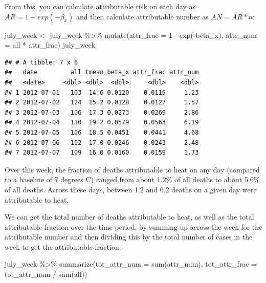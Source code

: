\documentclass[
]{book}
\newenvironment{Shaded}{\begin{snugshade}}{\end{snugshade}}
\newcommand{\AttributeTok}[1]{\textcolor[rgb]{0.77,0.63,0.00}{#1}}
\newcommand{\DecValTok}[1]{\textcolor[rgb]{0.00,0.00,0.81}{#1}}
\newcommand{\FunctionTok}[1]{\textcolor[rgb]{0.00,0.00,0.00}{#1}}
\newcommand{\NormalTok}[1]{#1}
\newcommand{\OtherTok}[1]{\textcolor[rgb]{0.56,0.35,0.01}{#1}}
\newcommand{\SpecialCharTok}[1]{\textcolor[rgb]{0.00,0.00,0.00}{#1}}
\begin{document}
From this, you can calculate attributable risk on each day as \(AR = 1 - exp(-\beta_x)\) and then calculate attributable number as \(AN = AR * n\):

\begin{Shaded}
\begin{Highlighting}[]
\NormalTok{july\_week }\OtherTok{\textless{}{-}}\NormalTok{ july\_week }\SpecialCharTok{\%\textgreater{}\%} 
  \FunctionTok{mutate}\NormalTok{(}\AttributeTok{attr\_frac =} \DecValTok{1} \SpecialCharTok{{-}} \FunctionTok{exp}\NormalTok{(}\SpecialCharTok{{-}}\NormalTok{beta\_x),}
         \AttributeTok{attr\_num =}\NormalTok{ all }\SpecialCharTok{*}\NormalTok{ attr\_frac)}
\NormalTok{july\_week}
\end{Highlighting}
\end{Shaded}

\begin{verbatim}
## # A tibble: 7 x 6
##   date         all tmean beta_x attr_frac attr_num
##   <date>     <dbl> <dbl>  <dbl>     <dbl>    <dbl>
## 1 2012-07-01   103  14.6 0.0120    0.0119     1.23
## 2 2012-07-02   124  15.2 0.0128    0.0127     1.57
## 3 2012-07-03   106  17.3 0.0273    0.0269     2.86
## 4 2012-07-04   110  19.2 0.0579    0.0563     6.19
## 5 2012-07-05   106  18.5 0.0451    0.0441     4.68
## 6 2012-07-06   102  17.0 0.0246    0.0243     2.48
## 7 2012-07-07   109  16.0 0.0160    0.0159     1.73
\end{verbatim}

Over this week, the fraction of deaths attributable to heat on any day (compared to a baseline of 7 degrees C) ranged from about 1.2\% of all deaths to about 5.6\% of all deaths. Across these days, between 1.2 and 6.2 deaths on a given day were attributable to heat.

We can get the total number of deaths attributable to heat, as well as the total attributable fraction over the time period, by summing up across the week for the attributable number and then dividing this by the total number of cases in the week to get the attributable fraction:

\begin{Shaded}
\begin{Highlighting}[]
\NormalTok{july\_week }\SpecialCharTok{\%\textgreater{}\%} 
  \FunctionTok{summarize}\NormalTok{(}\AttributeTok{tot\_attr\_num =} \FunctionTok{sum}\NormalTok{(attr\_num), }
            \AttributeTok{tot\_attr\_frac =}\NormalTok{ tot\_attr\_num }\SpecialCharTok{/} \FunctionTok{sum}\NormalTok{(all))}
\end{Highlighting}
\end{Shaded}
\end{document}
